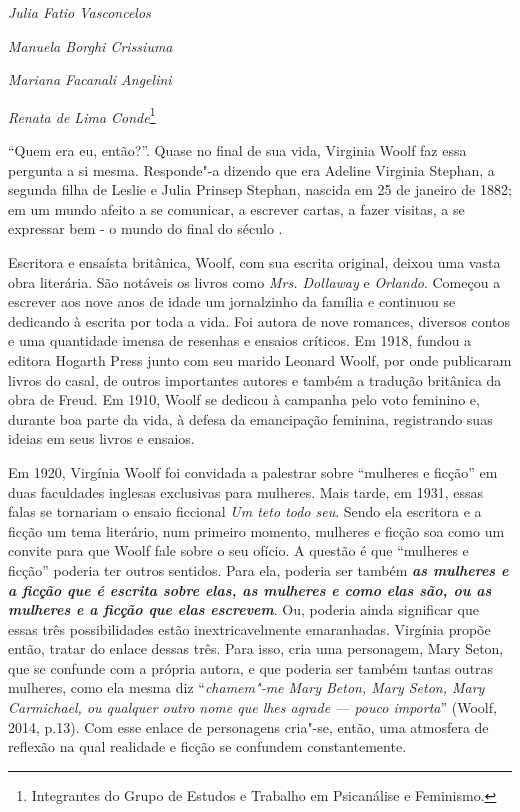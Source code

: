\begin{flushright}
\emph{Julia Fatio Vasconcelos}

\emph{Manuela Borghi Crissiuma}

\emph{Mariana Facanali Angelini}

\emph{Renata de Lima Conde}\footnote{Integrantes do Grupo de Estudos e
  Trabalho em Psicanálise e Feminismo.}
\end{flushright}

``Quem era eu, então?''. Quase no final de sua vida, Virginia Woolf faz
essa pergunta a si mesma. Responde"-a dizendo que era Adeline Virginia
Stephan, a segunda filha de Leslie e Julia Prinsep Stephan, nascida em
25 de janeiro de 1882; em um mundo afeito a se comunicar, a escrever
cartas, a fazer visitas, a se expressar bem - o mundo do final do século
.

Escritora e ensaísta britânica, Woolf, com sua escrita original, deixou
uma vasta obra literária. São notáveis os livros como \emph{Mrs.
Dollaway} e \emph{Orlando}. Começou a escrever aos nove anos de idade um
jornalzinho da família e continuou se dedicando à escrita por toda a
vida. Foi autora de nove romances, diversos contos e uma quantidade
imensa de resenhas e ensaios críticos. Em 1918, fundou a editora Hogarth
Press junto com seu marido Leonard Woolf, por onde publicaram livros do
casal, de outros importantes autores e também a tradução britânica da
obra de Freud. Em 1910, Woolf se dedicou à campanha pelo voto feminino
e, durante boa parte da vida, à defesa da emancipação feminina,
registrando suas ideias em seus livros e ensaios.

Em 1920, Virgínia Woolf foi convidada a palestrar sobre ``mulheres e
ficção'' em duas faculdades inglesas exclusivas para mulheres. Mais
tarde, em 1931, essas falas se tornariam o ensaio ficcional \emph{Um
teto todo seu}. Sendo ela escritora e a ficção um tema literário, num
primeiro momento, mulheres e ficção soa como um convite para que Woolf
fale sobre o seu ofício. A questão é que ``mulheres e ficção'' poderia
ter outros sentidos. Para ela, poderia ser também \emph{\textbf{as
mulheres e a ficção que é escrita sobre elas, as mulheres e como elas
são, ou as mulheres e a ficção que elas escrevem}}. Ou, poderia ainda
significar que essas três possibilidades estão inextricavelmente
emaranhadas. Virgínia propõe então, tratar do enlace dessas três. Para
isso, cria uma personagem, Mary Seton, que se confunde com a própria
autora, e que poderia ser também tantas outras mulheres, como ela mesma
diz ``\emph{chamem"-me Mary Beton, Mary Seton, Mary Carmichael, ou
qualquer outro nome que lhes agrade --- pouco importa}'' (Woolf, 2014,
p.13). Com esse enlace de personagens cria"-se, então, uma atmosfera de
reflexão na qual realidade e ficção se confundem constantemente.

